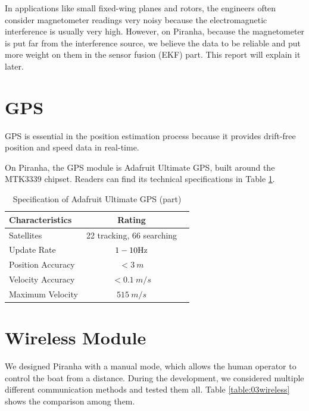 In applications like small fixed-wing planes and rotors, the engineers often consider magnetometer readings very noisy because the electromagnetic interference is usually very high. However, on Piranha, because the magnetometer is put far from the interference source, we believe the data to be reliable and put more weight on them in the sensor fusion (EKF) part. This report will explain it later.

\section{GPS}

GPS is essential in the position estimation process because it provides drift-free position and speed data in real-time.

On Piranha, the GPS module is Adafruit Ultimate GPS, built around the MTK3339 chipset. Readers can find its technical specifications in Table \ref{table:03gps}.

\begin{table}[ht]
\caption{Specification of Adafruit Ultimate GPS (part)} %
\centering %
\renewcommand{\arraystretch}{0.8}
\begin{tabular}{l c l} %
\hline
\textbf{Characteristics} & \textbf{Rating} \\ 
\hline %
Satellites & 22 tracking, 66 searching \\
Update Rate & $1-10 {\rm Hz}$ \\
Position Accuracy & $<3 \ m$ \\
Velocity Accuracy & $<0.1\ m/s$ \\
Maximum Velocity & $515\ m/s$ \\

\hline
\end{tabular}
\label{table:03gps} %
\end{table}

\section{Wireless Module}

We designed Piranha with a manual mode, which allows the human operator to control the boat from a distance. During the development, we considered multiple different communication methods and tested them all. Table \ref{table:03wireless} shows the comparison among them.

